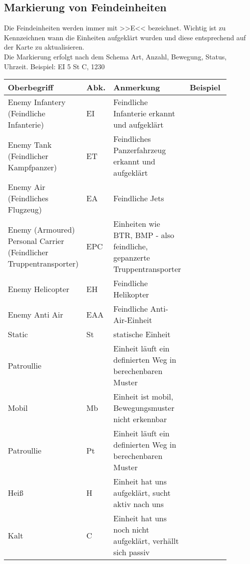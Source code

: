 \newpage

\subsection{Markierung von Feindeinheiten}
\label{EnemyUnits}

Die Feindeinheiten werden immer mit >>E<< bezeichnet. Wichtig ist zu Kennzeichnen wann die Einheiten aufgeklärt wurden und diese entsprechend auf der Karte zu aktualisieren. \\
Die Markierung erfolgt nach dem Schema Art, Anzahl, Bewegung, Status, Uhrzeit. Beispiel: EI 5 St  C, 1230

\begin{longtable}{|p{0.3\linewidth}|p{0.05\linewidth}|p{0.35\linewidth}|p{0.2\linewidth}|}
	\hline
	Oberbegriff		&	Abk.	&	Anmerkung 	&	Beispiel \\ 
	\hline
	Enemy Infantery (Feindliche Infanterie)		&	EI	&	Feindliche Infanterie erkannt und aufgeklärt	&	\\ 
	\hline
	Enemy Tank (Feindlicher Kampfpanzer)	&	ET	&	Feindliches Panzerfahrzeug erkannt und aufgeklärt	&	\\ 
	\hline	
	Enemy Air (Feindliches Flugzeug)	&	EA	&	Feindliche Jets	&	\\ 
	\hline	
	Enemy (Armoured) Personal Carrier (Feindlicher Truppentransporter)	&	EPC	&	Einheiten wie BTR, BMP - also feindliche, gepanzerte Truppentransporter	&	\\ 
	\hline	
	Enemy Helicopter	&	EH	&	Feindliche Helikopter	&	\\ 
	\hline	
	Enemy Anti Air	&	EAA		&	Feindliche Anti-Air-Einheit	&	\\ 
	\hline	
	Static	&	St	&	statische Einheit	&	\\ 
	\hline	
	Patroullie	&	&	Einheit läuft ein definierten Weg in berechenbaren Muster	&	\\ 
	\hline	
	Mobil	&	Mb	&	Einheit ist mobil, Bewegungsmuster nicht erkennbar &	\\ 
	\hline	
	Patroullie	&	Pt	&	Einheit läuft ein definierten Weg in berechenbaren Muster	&	\\ 
	\hline
	Heiß	&	H	&	Einheit hat uns aufgeklärt, sucht aktiv nach uns	&	\\ 
	\hline	
	Kalt	&	C	&	Einheit hat uns noch nicht aufgeklärt, verhällt sich passiv	&	\\ 
	\hline		
\end{longtable}